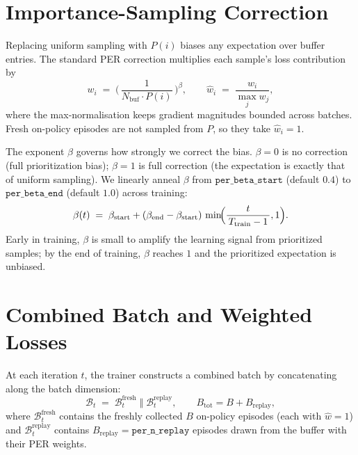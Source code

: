 \documentclass[11pt]{article}
\begin{document}
\section{Importance-Sampling Correction}

Replacing uniform sampling with $P(i)$ biases any expectation over
buffer entries. The standard PER correction multiplies each sample's
loss contribution by
\begin{equation}
w_i \;=\; \biggl(\, \frac{1}{N_{\text{buf}} \cdot P(i)} \,\biggr)^{\!\beta},
\qquad
\hat w_i \;=\; \frac{w_i}{\max_j w_j},
\label{eq:is_weight}
\end{equation}
where the max-normalisation keeps gradient magnitudes bounded across
batches. Fresh on-policy episodes are not sampled from $P$, so they
take $\hat w_i = 1$.

The exponent $\beta$ governs how strongly we correct the bias.
$\beta = 0$ is no correction (full prioritization bias); $\beta = 1$
is full correction (the expectation is exactly that of uniform
sampling). We linearly anneal $\beta$ from
$\texttt{per\_beta\_start}$ (default $0.4$) to
$\texttt{per\_beta\_end}$ (default $1.0$) across training:
\begin{equation}
\beta(t) \;=\; \beta_{\text{start}} +
(\beta_{\text{end}} - \beta_{\text{start}})\, \min\!\Bigl(\frac{t}{\,T_{\text{train}}-1\,}, 1\Bigr).
\end{equation}
Early in training, $\beta$ is small to amplify the learning signal
from prioritized samples; by the end of training, $\beta$ reaches
$1$ and the prioritized expectation is unbiased.

\section{Combined Batch and Weighted Losses}

At each iteration $t$, the trainer constructs a combined batch by
concatenating along the batch dimension:
\begin{equation}
\mathcal{B}_t \;=\; \mathcal{B}^{\text{fresh}}_t \;\Vert\; \mathcal{B}^{\text{replay}}_t,
\qquad
B_{\text{tot}} = B + B_{\text{replay}},
\end{equation}
where $\mathcal{B}^{\text{fresh}}_t$ contains the freshly collected
$B$ on-policy episodes (each with $\hat w = 1$) and
$\mathcal{B}^{\text{replay}}_t$ contains $B_{\text{replay}} =
\texttt{per\_n\_replay}$ episodes drawn from the buffer with their
PER weights.
\end{document}
